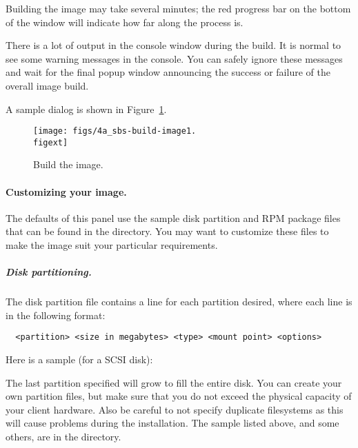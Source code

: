 Building the image may take several minutes; the red progress bar on
the bottom of the window will indicate how far along the process is.

There is a lot of output in the console window during the build.  It
is normal to see some warning messages in the console.  You can safely
ignore these messages and wait for the final popup window announcing
the success or failure of the overall image build.
  
A sample dialog is shown in Figure~\ref{fig:detailed-build-image}.

\begin{figure}[htbp]
  \begin{center}
    \texttt{[image: figs/4a\_sbs-build-image1.\\figext]}
    \caption{Build the image.}
    \label{fig:detailed-build-image}
  \end{center}
\end{figure}
  
\paragraph{Customizing your image.}

The defaults of this panel use the sample disk partition and RPM
package files that can be found in the  directory.
You may want to customize these files to make the image suit your
particular requirements.

\subparagraph{Disk partitioning.}

The disk partition file contains a line for each partition desired,
where each line is in the following format:

\begin{verbatim}
  <partition> <size in megabytes> <type> <mount point> <options>
\end{verbatim}

Here is a sample (for a SCSI disk):




The last partition specified will grow to fill the entire disk.  You
can create your own partition files, but make sure that you do not
exceed the physical capacity of your client hardware. Also be careful
to not specify duplicate filesystems as this will cause problems 
during the installation. The sample listed above, and some others, 
are in the  directory.

